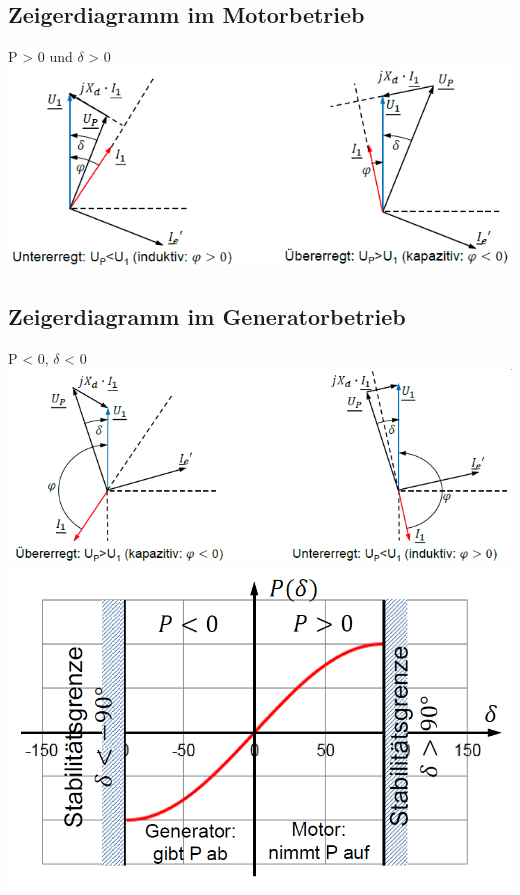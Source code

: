 \subsection{Zeigerdiagramm im Motorbetrieb}
P > 0 und $\delta$ > 0 \newline \newline
\includegraphics[width = 12 cm]{images/ZeigerdiagrammSynchronmaschine}
\subsection{Zeigerdiagramm im Generatorbetrieb}
P < 0, $\delta$ < 0  \newline
\includegraphics[width = 12 cm]{images/ZeigerdiagrammGeneratorbetrieb} \newline \newline
\includegraphics[scale = 0.4]{images/Stabilitaet}
